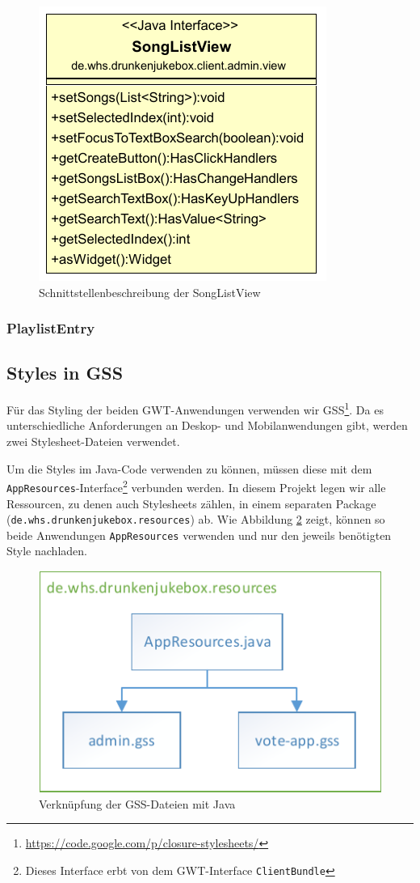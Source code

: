 \begin{figure}[H]
\centering
\includegraphics[width=0.4\linewidth]{Bilder/SongListViewClass}
\caption{Schnittstellenbeschreibung der SongListView}
\label{fig:SongListViewClass}
\end{figure}


\subsubsection{PlaylistEntry}



\subsection{Styles in GSS}
Für das Styling der beiden GWT-Anwendungen verwenden wir GSS\footnote{\url{https://code.google.com/p/closure-stylesheets/}}. Da es unterschiedliche Anforderungen
an Deskop- und Mobilanwendungen gibt, werden zwei Stylesheet-Dateien verwendet.

Um die Styles im Java-Code verwenden zu können, müssen diese mit dem \texttt{AppResources}-Interface\footnote{Dieses Interface erbt von dem GWT-Interface \texttt{ClientBundle}} verbunden werden.
In diesem Projekt legen wir alle Ressourcen, zu denen auch Stylesheets zählen, in
einem separaten Package (\texttt{de.whs.drunkenjukebox.resources}) ab. Wie Abbildung
\ref{fig:GSS} zeigt, können so beide Anwendungen \texttt{AppResources} verwenden
und nur den jeweils benötigten Style nachladen.

\begin{figure}[tbh]
\centering
\includegraphics[width=0.6\linewidth]{Bilder/GSS}
\caption{Verknüpfung der GSS-Dateien mit Java}
\label{fig:GSS}
\end{figure}

